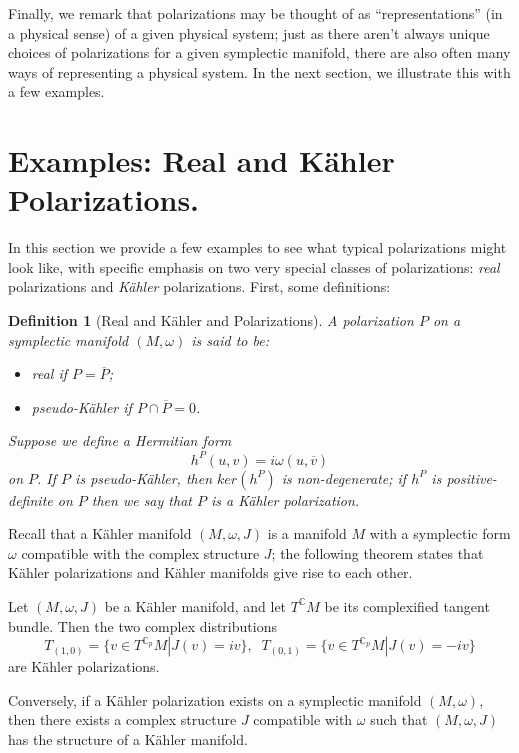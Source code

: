 \documentclass{tufte-handout}
\newtheorem{defn}{Definition}
\begin{document}
Finally, we remark that polarizations may be thought of as ``representations'' (in a physical sense) of a given physical system; just as there aren't always unique choices of polarizations for a given symplectic manifold, there are also often many ways of representing a physical system. In the next section, we illustrate this with a few examples.

\section{Examples: Real and K\"{a}hler Polarizations.}
In this section we provide a few examples to see what typical polarizations might look like, with specific emphasis on two very special classes of polarizations: \textit{real} polarizations and \textit{K\"{a}hler} polarizations. First, some definitions:
\begin{fullwidth}
\begin{defn}[Real and K\"{a}hler and Polarizations]
A polarization $P$ on a symplectic manifold $(M,\omega)$ is said to be:
\begin{itemize}
\item \emph{real} if $P = \overline{P}$;
\item \emph{pseudo-K\"{a}hler} if $P \cap \overline{P} = 0$.
\end{itemize}
Suppose we define a Hermitian form
$$
h^P(u,v) = i\omega(u,\overline{v})
$$
on $P$. If $P$ is pseudo-K\"{a}hler, then $ker(h^P)$ is non-degenerate; if $h^P$ is positive-definite on $P$ then we say that $P$ is a K\"{a}hler polarization.
\end{defn}
\end{fullwidth}
Recall that a K\"{a}hler manifold $(M,\omega,J)$ is a manifold $M$ with a symplectic form $\omega$ compatible with the complex structure $J$; the following theorem states that K\"{a}hler polarizations and K\"{a}hler manifolds give rise to each other.
\begin{fullwidth}
\begin{theorem}
Let $(M,\omega,J)$ be a K\"{a}hler manifold, and let $T^{\mathbb{C}}M$ be its complexified tangent bundle. Then the two complex distributions
$$
T_{(1,0)} = \{ v \in T^{\mathbb{C}_p} M | J(v) = iv \},\;\; T_{(0,1)} = \{ v \in T^{\mathbb{C}_p} M | J(v) = -iv \}
$$
are K\"{a}hler polarizations.

Conversely, if a K\"{a}hler polarization exists on a symplectic manifold $(M,\omega)$, then there exists a complex structure $J$ compatible with $\omega$ such that $(M,\omega,J)$ has the structure of a K\"{a}hler manifold.
\end{theorem}
\end{fullwidth}
\end{document}
